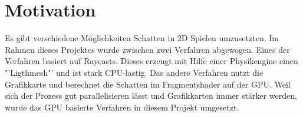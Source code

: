 \chapter{Motivation}
Es gibt verschiedene Möglichkeiten Schatten in 2D Spielen umzusetzten. 
Im Rahmen dieses Projektes wurde zwischen zwei Verfahren abgewogen. Eines der Verfahren basiert auf Raycasts. Dieses erzeugt mit Hilfe einer Physikengine einen "'Ligthmesh"' und ist stark CPU-lastig. Das andere Verfahren nutzt die Grafikkarte und berechnet die Schatten im Fragmentshader auf der GPU.
Weil sich der Prozess gut parallelisieren lässt und Grafikkarten immer stärker werden, wurde das GPU basierte Verfahren in diesem Projekt umgesetzt. 
